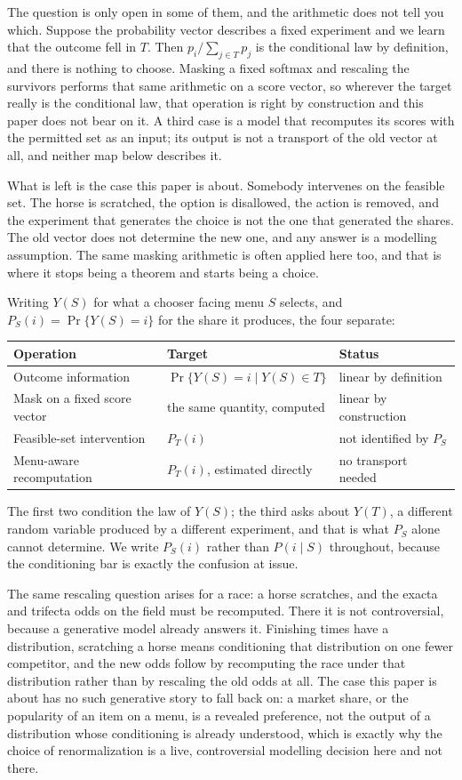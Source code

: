 \documentclass[11pt]{article}
\begin{document}
The question is only open in some of them, and the arithmetic does not tell you which. Suppose the
probability vector describes a fixed experiment and we learn that the outcome fell in $T$. Then
$p_i / \sum_{j \in T} p_j$ is the conditional law by definition, and there is nothing to choose.
Masking a fixed softmax and rescaling the survivors performs that same arithmetic on a score
vector, so wherever the target really is the conditional law, that operation is right by
construction and this paper does not bear on it. A third case is a model that recomputes its
scores with the permitted set as an input; its output is not a transport of the old vector at
all, and neither map below describes it.

What is left is the case this paper is about. Somebody intervenes on the feasible set. The horse
is scratched, the option is disallowed, the action is removed, and the experiment that generates
the choice is not the one that generated the shares. The old vector does not determine the new
one, and any answer is a modelling assumption. The same masking arithmetic is often applied here
too, and that is where it stops being a theorem and starts being a choice.

Writing $Y(S)$ for what a chooser facing menu $S$ selects, and $P_S(i) = \Pr\{Y(S) = i\}$ for the
share it produces, the four separate:
\begin{center}
\small
\begin{tabular}{lll}
\toprule
Operation & Target & Status \\
\midrule
Outcome information & $\Pr\{Y(S) = i \mid Y(S) \in T\}$ & linear by definition \\
Mask on a fixed score vector & the same quantity, computed & linear by construction \\
Feasible-set intervention & $P_T(i)$ & not identified by $P_S$ \\
Menu-aware recomputation & $P_T(i)$, estimated directly & no transport needed \\
\bottomrule
\end{tabular}
\end{center}
The first two condition the law of $Y(S)$; the third asks about $Y(T)$, a different random
variable produced by a different experiment, and that is what $P_S$ alone cannot determine. We
write $P_S(i)$ rather than $P(i \mid S)$ throughout, because the conditioning bar is exactly the
confusion at issue.

The same rescaling question arises for a race: a horse scratches, and the exacta and trifecta
odds on the field must be recomputed. There it is not controversial, because a generative
model already answers it. Finishing times have a distribution, scratching a horse means
conditioning that distribution on one fewer competitor, and the new odds follow by
recomputing the race under that distribution rather than by rescaling the old odds at all. The
case this paper is about has no such generative story to fall back on: a market share, or the
popularity of an item on a menu, is a revealed preference, not the output of a distribution
whose conditioning is already understood, which is exactly why the choice of renormalization
is a live, controversial modelling decision here and not there.
\end{document}

